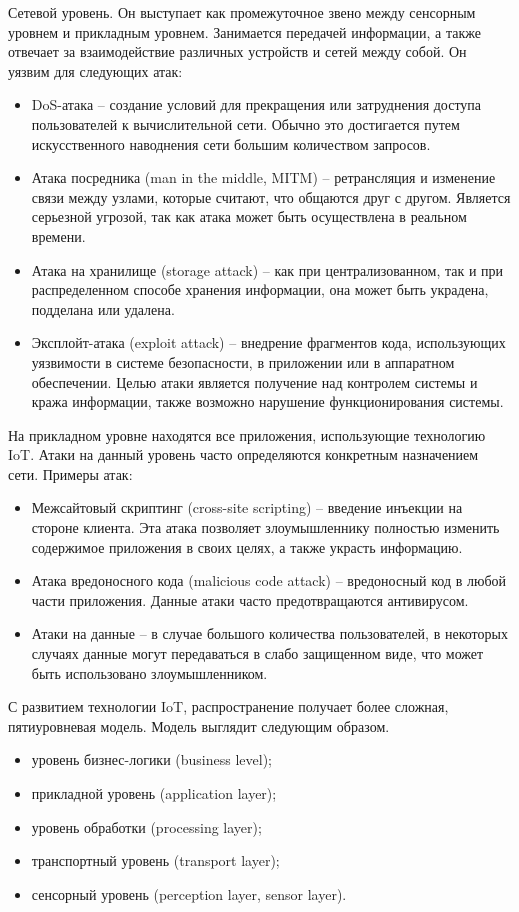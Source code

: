 Сетевой уровень. Он выступает как промежуточное звено между сенсорным уровнем и прикладным уровнем. Занимается передачей информации, а также отвечает за взаимодействие различных устройств и сетей между собой. Он уязвим для следующих атак:
\begin{itemize}
	\item DoS-атака – создание условий для прекращения или затруднения доступа пользователей к вычислительной сети. Обычно это достигается путем искусственного наводнения сети большим количеством запросов.
	\item Атака посредника (man in the middle, MITM) – ретрансляция и изменение связи между узлами, которые считают, что общаются друг с другом. Является серьезной угрозой, так как атака может быть осуществлена в реальном времени.
	\item Атака на хранилище (storage attack) – как при централизованном, так и при распределенном способе хранения информации, она может быть украдена, подделана или удалена.
	\item Эксплойт-атака (exploit attack) – внедрение фрагментов кода, использующих уязвимости в системе безопасности, в приложении или в аппаратном обеспечении. Целью атаки является получение над контролем системы и кража информации, также возможно нарушение функционирования системы.
\end{itemize}

На прикладном уровне находятся все приложения, использующие технологию IoT. Атаки на данный уровень часто определяются конкретным назначением сети. Примеры атак:
\begin{itemize}
	\item Межсайтовый скриптинг (cross-site scripting) – введение инъекции на стороне клиента. Эта атака позволяет злоумышленнику полностью изменить содержимое приложения в своих целях, а также украсть информацию.
	\item Атака вредоносного кода (malicious code attack) – вредоносный код в любой части приложения. Данные атаки часто предотвращаются антивирусом.
	\item Атаки на данные – в случае большого количества пользователей, в некоторых случаях данные могут передаваться в слабо защищенном виде, что может быть использовано злоумышленником.
\end{itemize}

С развитием технологии IoT, распространение получает более сложная, пятиуровневая модель. Модель выглядит следующим образом.
\begin{itemize}
	\item уровень бизнес-логики (business level);
	\item прикладной уровень (application layer);
	\item уровень обработки (processing layer);
	\item транспортный уровень (transport layer);
	\item сенсорный уровень (perception layer, sensor layer). 
\end{itemize}

